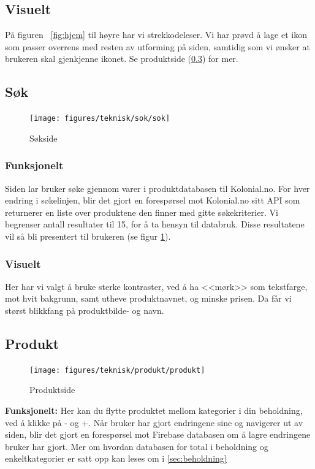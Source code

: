 \subsection{\textbf{Visuelt}}
På figuren ~\ref{fig:hjem} til høyre har vi strekkodeleser. Vi har prøvd å lage et ikon som passer overrens med resten av utforming på siden, samtidig som vi ønsker at brukeren skal gjenkjenne ikonet. Se produktside (\ref{sec:produkt}) for mer.

\subsection{\textbf{Søk}}
\begin{figure}[H]
    \texttt{[image: figures/teknisk/sok/sok]}
    \caption[Søkside]{Søkside
    \label{fig:sok}}
\end{figure}

\subsubsection{\textbf{Funksjonelt}}
Siden lar bruker søke gjennom varer i produktdatabasen til Kolonial.no. 
For hver endring i søkelinjen, blir det gjort en forespørsel mot Kolonial.no sitt API som returnerer en liste over produktene den finner med gitte søkekriterier. Vi begrenser antall resultater til 15, for å ta hensyn til databruk. Disse resultatene vil så bli presentert til brukeren (se figur \ref{fig:sok}).

\subsubsection{\textbf{Visuelt}}
Her har vi valgt å bruke sterke kontraster, ved å ha <<mørk>> som tekstfarge, mot hvit bakgrunn, samt utheve produktnavnet, og minske prisen. Da får vi størst blikkfang på produktbilde- og navn. 

\subsection{\textbf{Produkt}}
\label{sec:produkt}
\begin{figure}[H]
    \texttt{[image: figures/teknisk/produkt/produkt]}
    \caption[Produkt]{Produktside
    \label{fig:produkt}}
\end{figure}

\textbf{Funksjonelt:}
Her kan du flytte produktet mellom kategorier i din beholdning, ved å klikke på - og +. Når bruker har gjort endringene sine og navigerer ut av siden, blir det gjort en forespørsel mot Firebase databasen om å lagre endringene bruker har gjort. Mer om hvordan databasen for total i beholdning og enkeltkategorier er satt opp kan leses om i \ref{sec:beholdning}


